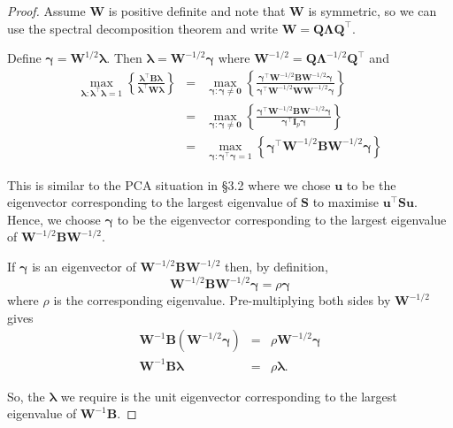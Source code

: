 \documentclass[]{book}
\theoremstyle{definition}
\theoremstyle{definition}
\theoremstyle{definition}
\theoremstyle{remark}
\begin{document}
\begin{proof}
{}Assume \(\boldsymbol W\) is positive definite and note that \(\boldsymbol W\) is symmetric, so we can use the spectral decomposition theorem and write \(\boldsymbol W= \boldsymbol Q\boldsymbol \Lambda\boldsymbol Q^\top\).

Define \(\boldsymbol \gamma= \boldsymbol W^{1/2} \boldsymbol \lambda\). Then \(\boldsymbol \lambda= \boldsymbol W^{-1/2} \boldsymbol \gamma\) where
\(\boldsymbol W^{-1/2}=\boldsymbol Q\boldsymbol \Lambda^{-1/2} \boldsymbol Q^\top\) and
\begin{eqnarray*}
\max_{\boldsymbol \lambda\colon \boldsymbol \lambda^\top \boldsymbol \lambda=1} \left\{ \frac{\boldsymbol \lambda^\top \boldsymbol B\boldsymbol \lambda}{\boldsymbol \lambda^\top \boldsymbol W\boldsymbol \lambda} \right\}
&=& \max_{\boldsymbol \gamma\colon \boldsymbol \gamma\neq \boldsymbol 0} \left\{ \frac{\boldsymbol \gamma^\top \boldsymbol W^{-1/2} \boldsymbol B\boldsymbol W^{-1/2} \boldsymbol \gamma} {\boldsymbol \gamma^\top \boldsymbol W^{-1/2} \boldsymbol W\boldsymbol W^{-1/2} \boldsymbol \gamma} \right\} \\
&=& \max_{\boldsymbol \gamma\colon \boldsymbol \gamma\neq \boldsymbol 0} \left\{ \frac{ \boldsymbol \gamma^\top \boldsymbol W^{-1/2} \boldsymbol B\boldsymbol W^{-1/2} \boldsymbol \gamma}{\boldsymbol \gamma^\top \boldsymbol I_p \boldsymbol \gamma} \right\} \\
&=& \max_{\boldsymbol \gamma\colon \boldsymbol \gamma^\top \boldsymbol \gamma=1} \left\{ \boldsymbol \gamma^\top \boldsymbol W^{-1/2} \boldsymbol B\boldsymbol W^{-1/2} \boldsymbol \gamma\right\}
\end{eqnarray*}

This is similar to the PCA situation in \S 3.2 where we chose \(\boldsymbol u\) to be the eigenvector corresponding to the largest eigenvalue of \(\boldsymbol S\) to maximise \(\boldsymbol u^\top \boldsymbol S\boldsymbol u\). Hence, we choose \(\boldsymbol \gamma\) to be the eigenvector corresponding to the largest eigenvalue of \(\boldsymbol W^{-1/2} \boldsymbol B\boldsymbol W^{-1/2}\).

If \(\boldsymbol \gamma\) is an eigenvector of \(\boldsymbol W^{-1/2} \boldsymbol B\boldsymbol W^{-1/2}\) then, by definition,
\[\boldsymbol W^{-1/2} \boldsymbol B\boldsymbol W^{-1/2} \boldsymbol \gamma= \rho \boldsymbol \gamma\]
where \(\rho\) is the corresponding eigenvalue. Pre-multiplying both sides by \(\boldsymbol W^{-1/2}\) gives
\begin{eqnarray*}
\boldsymbol W^{-1} \boldsymbol B(\boldsymbol W^{-1/2} \boldsymbol \gamma) &=& \rho \boldsymbol W^{-1/2} \boldsymbol \gamma\\
\boldsymbol W^{-1} \boldsymbol B\boldsymbol \lambda&=& \rho \boldsymbol \lambda.
\end{eqnarray*}

So, the \(\boldsymbol \lambda\) we require is the unit eigenvector corresponding to the largest
eigenvalue of \(\boldsymbol W^{-1} \boldsymbol B\).
\end{proof}
\end{document}
